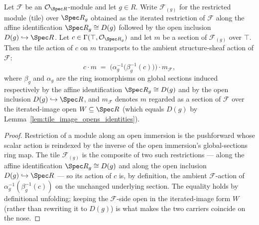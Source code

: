 \begin{lemma}
  \label{lem:modulesRestrictBasicOpen_smul_eq}
  Let \(\mathcal{F}\) be an \(\mathcal{O}_{\Spec R}\)-module and let \(g \in R\). Write
  \(\mathcal{F}_{(g)}\) for the restricted module (tile) over \(\Spec R_g\) obtained as the iterated
  restriction of \(\mathcal{F}\) along the affine identification \(\Spec R_g \cong D(g)\) followed by the
  open inclusion \(D(g) \hookrightarrow \Spec R\). Let \(c \in \Gamma(\top, \mathcal{O}_{\Spec R_g})\) and
  let \(m\) be a section of \(\mathcal{F}_{(g)}\) over \(\top\). Then the tile action of \(c\) on \(m\)
  transports to the ambient structure-sheaf action of \(\mathcal{F}\):
  \[
    c \cdot m \;=\; \bigl(\alpha_g^{-1}\bigl(\beta_g^{-1}(c)\bigr)\bigr) \cdot m_{\mathcal{F}},
  \]
  where \(\beta_g\) and \(\alpha_g\) are the ring isomorphisms on global sections induced respectively by
  the affine identification \(\Spec R_g \cong D(g)\) and by the open inclusion \(D(g) \hookrightarrow
  \Spec R\), and \(m_{\mathcal{F}}\) denotes \(m\) regarded as a section of \(\mathcal{F}\) over the
  iterated-image open \(W \subseteq \Spec R\) (which equals \(D(g)\) by
  Lemma~\ref{lem:tile_image_opens_identities}).
\end{lemma}
\begin{proof}
  \leanok
  Restriction of a module along an open immersion is the pushforward whose scalar action is reindexed by
  the inverse of the open immersion's global-sections ring map. The tile \(\mathcal{F}_{(g)}\) is the
  composite of two such restrictions --- along the affine identification \(\Spec R_g \cong D(g)\) and along
  the open inclusion \(D(g) \hookrightarrow \Spec R\) --- so its action of \(c\) is, by definition, the
  ambient \(\mathcal{F}\)-action of \(\alpha_g^{-1}(\beta_g^{-1}(c))\) on the unchanged underlying section.
  The equality holds by definitional unfolding; keeping the \(\mathcal{F}\)-side open in the
  iterated-image form \(W\) (rather than rewriting it to \(D(g)\)) is what makes the two carriers
  coincide on the nose.
\end{proof}

